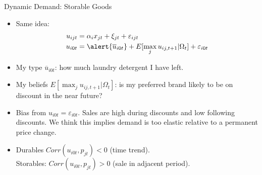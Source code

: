 \documentclass[xcolor=pdftex,dvipsnames,table,mathserif,aspectratio=169]{beamer}
\begin{document}
\begin{frame}{Dynamic Demand: Storable Goods}
\begin{itemize}
\item Same idea:
\begin{align*}
u_{ijt} &=   \alpha_i x_{jt}  +  \xi_{jt} + \varepsilon_{ijt}\\
u_{i0t} &=  \alert{\overline{u}_{i0t}} + E[\max_j u_{ij,t+1}| \Omega_t] + \varepsilon_{i0t} 
\end{align*}
\item My type $\overline{u}_{i0t}$: how much laundry detergent I have left.

\item My beliefs $E[\max_j u_{ij,t+1}| \Omega_t]$: is my preferred brand likely to be on discount in the near future?
\item Bias from $u_{i0t} = \varepsilon_{i0t}$. Sales are high during discounts and low following discounts. We think this implies demand is \alert{too elastic} relative to a permanent price change.
\item Durables $Corr(u_{i0t},p_{jt}) <0$ (time trend).\\
 Storables: $Corr(u_{i0t},p_{jt}) > 0 $ (sale in adjacent period).
\end{itemize}
\end{frame}
\end{document}

